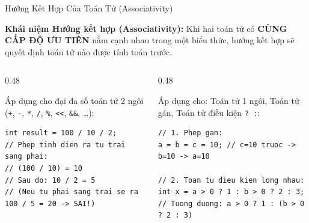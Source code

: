 \documentclass[aspectratio=169, 10pt]{beamer}
\begin{document}
\begin{frame}[fragile]{Hướng Kết Hợp Của Toán Tử (Associativity)}
  \begin{block}{\textbf{Khái niệm Hướng kết hợp (Associativity):}}
    Khi hai toán tử có \textbf{CÙNG CẤP ĐỘ ƯU TIÊN} nằm cạnh nhau trong một biểu thức, hướng kết hợp sẽ quyết định toán tử nào được tính toán trước.
  \end{block}

  \begin{columns}[T]
    \begin{column}{0.48\textwidth}
      \begin{tcolorbox}[colback=UniLightBlue!30,colframe=UniBlue,title=\textbf{Kết hợp từ Trái sang Phải (Left-to-Right)},fonttitle=\small\bfseries]
        Áp dụng cho đại đa số toán tử 2 ngôi (\texttt{+}, \texttt{-}, \texttt{*}, \texttt{/}, \texttt{\%}, \texttt{<<}, \texttt{\&\&}, \dots):
\begin{lstlisting}[numbers=none]
int result = 100 / 10 / 2;
// Phep tinh dien ra tu trai sang phai:
// (100 / 10) = 10
// Sau do: 10 / 2 = 5
// (Neu tu phai sang trai se ra 100 / 5 = 20 -> SAI!)
\end{lstlisting}
      \end{tcolorbox}
    \end{column}

    \begin{column}{0.48\textwidth}
      \begin{tcolorbox}[colback=CSharpPurple!10,colframe=CSharpPurple,title=\textbf{Kết hợp từ Phải sang Trái (Right-to-Left)},fonttitle=\small\bfseries]
        Áp dụng cho: Toán tử 1 ngôi, Toán tử gán, Toán tử điều kiện \texttt{? :}:
\begin{lstlisting}[numbers=none]
// 1. Phep gan:
a = b = c = 10; // c=10 truoc -> b=10 -> a=10

// 2. Toan tu dieu kien long nhau:
int x = a > 0 ? 1 : b > 0 ? 2 : 3;
// Tuong duong: a > 0 ? 1 : (b > 0 ? 2 : 3)
\end{lstlisting}
      \end{tcolorbox}
    \end{column}
  \end{columns}
\end{frame}
\end{document}
